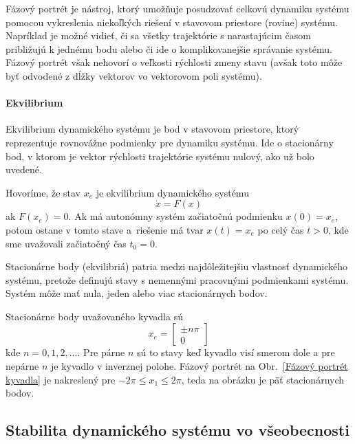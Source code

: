 \documentclass[a4paper, 10pt, ]{article}
\begin{document}
Fázový portrét je nástroj, ktorý umožňuje posudzovať celkovú dynamiku systému pomocou vykreslenia niekoľkých riešení v stavovom priestore (rovine) systému. Napríklad je možné vidieť, či sa všetky trajektórie s narastajúcim časom približujú k jednému bodu alebo či ide o komplikovanejšie správanie systému. Fázový portrét však nehovorí o veľkosti rýchlosti zmeny stavu (avšak toto môže byť odvodené z dĺžky vektorov vo vektorovom poli systému).




\paragraph{Ekvilibrium}

Ekvilibrium dynamického systému je bod v stavovom priestore, ktorý reprezentuje rovnovážne podmienky pre dynamiku systému. Ide o stacionárny bod, v ktorom je vektor rýchlosti trajektórie systému nulový, ako už bolo uvedené.

Hovoríme, že stav $x_e$ je ekvilibrium dynamického systému
\begin{equation*}
	\dot{x} = F(x)
\end{equation*}
ak $F(x_e) = 0$. Ak má autonómny systém začiatočnú podmienku $x(0) = x_e$, potom ostane v tomto stave a~riešenie má tvar $x(t) = x_e$ po celý čas $t>0$, kde sme uvažovali začiatočný čas $t_0 = 0$.

Stacionárne body (ekvilibriá) patria medzi najdôležitejšiu vlastnosť dynamického systému, pretože definujú stavy s nemennými pracovnými podmienkami systému. Systém môže mať nula, jeden alebo viac stacionárnych bodov.

Stacionárne body uvažovaného kyvadla sú
\begin{equation}
	x_e = \begin{bmatrix} \pm n \pi \\ 0 \end{bmatrix}
\end{equation}
kde $n = 0,1,2,\ldots$. Pre párne $n$ sú to stavy keď kyvadlo visí smerom dole a pre nepárne $n$ je kyvadlo v inverznej polohe. Fázový portrét na Obr.~\ref{Fázový portrét kyvadla} je nakreslený pre $-2\pi \leq x_1 \leq 2\pi$, teda na obrázku je päť stacionárnych bodov.



\subsection{Stabilita dynamického systému vo všeobecnosti}
\end{document}
